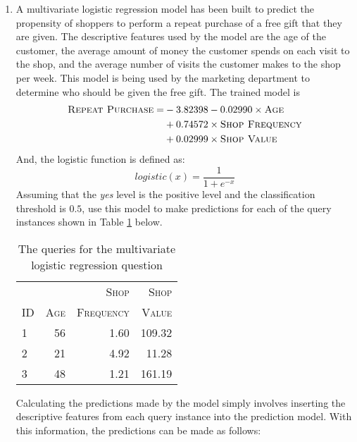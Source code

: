 \documentclass[nosolution]{ditpaper}
\begin{document}
\begin{enumerate}
\item A multivariate logistic regression model has been built to predict the propensity of shoppers to perform a repeat purchase of a free gift that they are given. The descriptive features used by the model are the age of the customer, the average amount of money the customer spends on each visit to the shop, and the average number of visits the customer makes to the shop per week. This model is being used by the marketing department to determine who should be given the free gift. The trained model is
\begin{alignat*}{2}
\textsc{Repeat~Purchase} = & -3.82398 - 0.02990   \times \textsc{Age} \\ 
& + 0.74572 \times \textsc{Shop~Frequency}\\
& + 0.02999 \times \textsc{Shop~Value}
\end{alignat*}
And, the logistic function is defined as:
\begin{equation*}
	logistic(x)=\frac{1}{1+e^{-x}}
\end{equation*}
Assuming that the \textit{yes} level is the positive level and the classification threshold is $0.5$, use this model to make predictions for each of the query instances shown in Table \ref{tab:logregress} below.

\begin{table}[!hb]
\caption{The queries for the multivariate logistic regression question}
\label{tab:logregress}
\begin{center}
\begin{tabular}{l r r r}
\hline
			 & ~ & \textsc{Shop}  & \textsc{Shop}\\
				\textsc{ID} & \textsc{Age} & \textsc{Frequency}  & \textsc{Value}\\
\hline
1 & 56 & 1.60 & 109.32 \\ 
2 & 21 & 4.92 & 11.28 \\  
3 & 48 & 1.21 & 161.19 \\ 
\hline
\end{tabular}
\end{center}
\end{table}
		\begin{answer}
		Calculating the predictions made by the model simply involves inserting the descriptive features from each query instance into the prediction model. With this information, the predictions can be made as follows:
				

\end{answer}
\end{enumerate}
\end{document}
